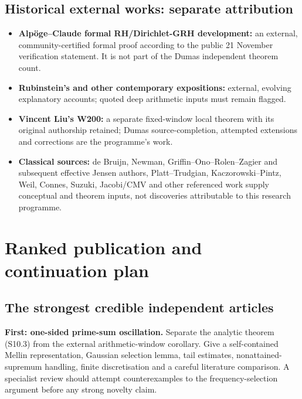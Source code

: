 \documentclass[
  10pt,
  a4paper,
  10pt,
  oneside,
  openany]{book}
\providecommand{\tightlist}{%
  \setlength{\itemsep}{0pt}\setlength{\parskip}{0pt}}
\begin{document}
\subsection{Historical external works: separate
attribution}\label{historical-external-works-separate-attribution}

\begin{itemize}
\tightlist
\item
  \textbf{Alpöge--Claude formal RH/Dirichlet-GRH development:} an
  external, community-certified formal proof according to the public 21
  November verification statement. It is not part of the Dumas
  independent theorem count.
\item
  \textbf{Rubinstein's and other contemporary expositions:} external,
  evolving explanatory accounts; quoted deep arithmetic inputs must
  remain flagged.
\item
  \textbf{Vincent Liu's W200:} a separate fixed-window local theorem
  with its original authorship retained; Dumas source-completion,
  attempted extensions and corrections are the programme's work.
\item
  \textbf{Classical sources:} de Bruijn, Newman,
  Griffin--Ono--Rolen--Zagier and subsequent effective Jensen authors,
  Platt--Trudgian, Kaczorowski--Pintz, Weil, Connes, Suzuki, Jacobi/CMV
  and other referenced work supply conceptual and theorem inputs, not
  discoveries attributable to this research programme.
\end{itemize}

\section{Ranked publication and continuation
plan}\label{ranked-publication-and-continuation-plan}

\subsection{The strongest credible independent
articles}\label{the-strongest-credible-independent-articles}

\textbf{First: one-sided prime-sum oscillation.} Separate the analytic
theorem (S10.3) from the external arithmetic-window corollary. Give a
self-contained Mellin representation, Gaussian selection lemma, tail
estimates, nonattained-supremum handling, finite discretisation and a
careful literature comparison. A specialist review should attempt
counterexamples to the frequency-selection argument before any strong
novelty claim.
\end{document}
